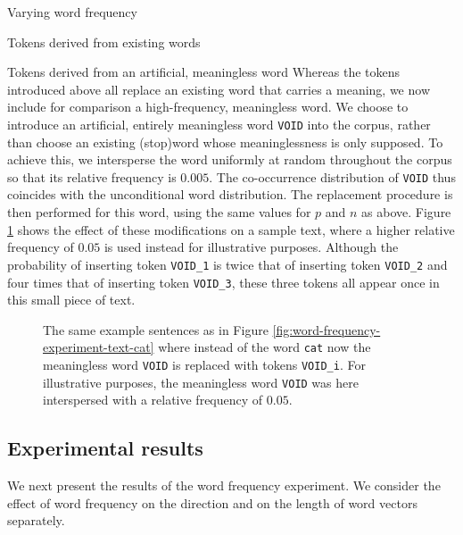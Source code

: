 \documentclass{article} %
\newcommand{\word}[1]{\texttt{#1}}
\begin{document}
\begin{section}{Varying word frequency}
\begin{subsection}{Tokens derived from existing words}
\end{subsection}

\begin{subsection}{Tokens derived from an artificial, meaningless word}\label{WFVEmeaningless}
Whereas the tokens introduced above all replace an existing word that
carries a meaning, we now include for comparison a high-frequency,
meaningless word.  We choose to introduce an artificial, entirely
meaningless word \word{VOID} into the corpus, rather than choose an
existing (stop)word whose meaninglessness is only supposed.  To achieve
this, we intersperse the word uniformly at random throughout the corpus so
that its relative frequency is $0.005$.  The co-occurrence
distribution of \word{VOID} thus coincides with the unconditional word
distribution.  The replacement procedure is then performed for this
word, using the same values for $p$ and $n$ as above.
Figure \ref{fig:word-frequency-experiment-text-void} shows the effect of
these modifications on a sample text, where a higher relative frequency of $0.05$ is used instead
for illustrative purposes.  Although the probability of inserting token
\word{VOID\_1} is twice that of inserting token \word{VOID\_2} and four
times that of inserting token \word{VOID\_3}, these three tokens all
appear once in this small piece of text.

\begin{figure}
	\begin{mdframed}
	
	\end{mdframed}
	\caption{The same example sentences as in
          Figure \ref{fig:word-frequency-experiment-text-cat} where
          instead of the word \word{cat} now the meaningless word
          \word{VOID} is replaced with tokens \word{VOID\_i}.  For
          illustrative purposes, the meaningless word \word{VOID} was
          here interspersed with a relative frequency of $0.05$.}
	\label{fig:word-frequency-experiment-text-void}
\end{figure}
\end{subsection}

\subsection{Experimental results}\label{WFVE-results}
We next present the results of the word frequency experiment. We
consider the effect of word frequency on the direction and on the length
of word vectors separately.


\end{section}
\end{document}
